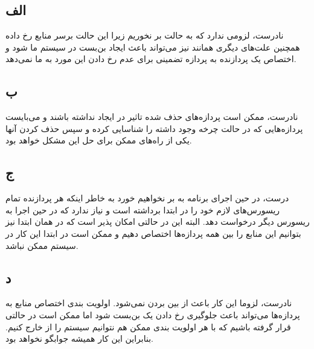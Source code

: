 \subsection*{الف}
نادرست، لزومی ندارد که به حالت
بر نخوریم زیرا این حالت برسر منابع رخ داده همچنین علت‌های دیگری همانند
نیز می‌تواند باعث ایجاد بن‌بست در سیستم ما شود و اختصاص یک پردازنده به پردازه تضمینی برای عدم رخ دادن این مورد به ما نمی‌دهد.

\subsection*{ب}
نادرست، ممکن است پردازه‌های حذف شده تاثیر در ایجاد
نداشته باشند و می‌بایست پردازه‌هایی که در حالت چرخه وجود داشته را شناسایی کرده و سپس حذف کردن آنها یکی از راه‌های ممکن برای حل این مشکل خواهد بود.

\subsection*{ج}
درست، در حین اجرای برنامه به 
بر نخواهیم خورد به خاطر اینکه هر پردازنده تمام ریسورس‌های لازم خود را در ابتدا برداشته است و نیاز ندارد که در حین اجرا به ریسورس دیگر درخواست دهد. البته این در حالتی امکان‌ پذیر است که در همان ابتدا نیز بتوانیم این منابع را بین همه پردازه‌ها اختصاص دهیم و ممکن است در ابتدا این کار در سیستم ممکن نباشد.

\subsection*{د}
نادرست، لزوما این کار باعث از بین بردن
نمی‌شود. اولویت بندی اختصاص منابع به پردازه‌ها می‌تواند باعث جلوگیری رخ دادن یک بن‌بست شود اما ممکن است در حالتی قرار گرفته باشیم که با هر اولویت بندی ممکن هم نتوانیم سیستم را از
خارج کنیم. بنابراین این کار همیشه جوابگو نخواهد بود.